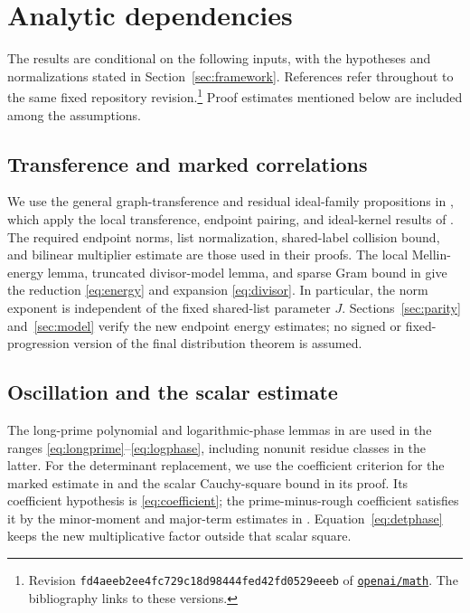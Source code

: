 \appendix
\section{Analytic dependencies}\label{sec:sources}

The results are conditional on the following inputs, with the hypotheses
and normalizations stated in Section~\ref{sec:framework}. References
\cite{D,S,P,Z} refer throughout to the same fixed repository revision.\footnote{Revision
\texttt{fd4aeeb2ee4fc729c18d98444fed42fd0529eeeb} of
\href{https://github.com/openai/math/tree/fd4aeeb2ee4fc729c18d98444fed42fd0529eeeb}{\texttt{openai/math}}.
The bibliography links to these versions.}
Proof estimates mentioned below are included among the assumptions.

\subsection*{Transference and marked correlations}
We use the general graph-transference and residual ideal-family
propositions in \cite[Section 6]{D}, which apply the local transference,
endpoint pairing, and ideal-kernel results of \cite[Sections 3--4]{S}.
The required endpoint norms, list normalization, shared-label collision
bound, and bilinear multiplier estimate are those used in their proofs.
The local Mellin-energy lemma, truncated divisor-model lemma, and sparse
Gram bound in \cite[Section 6]{D} give the reduction
\eqref{eq:energy} and expansion \eqref{eq:divisor}.
In particular, the norm exponent is independent of the fixed shared-list
parameter $J$. Sections~\ref{sec:parity} and~\ref{sec:model} verify the
new endpoint energy estimates; no signed or fixed-progression version
of the final distribution theorem is assumed.

\subsection*{Oscillation and the scalar estimate}
The long-prime polynomial and logarithmic-phase lemmas in
\cite[Appendix A]{D} are used in the ranges
\eqref{eq:longprime}--\eqref{eq:logphase}, including nonunit residue
classes in the latter. For the determinant replacement, we use the
coefficient criterion for the marked estimate in \cite[Section 8]{P}
and the scalar Cauchy-square bound in its proof. Its coefficient
hypothesis is \eqref{eq:coefficient}; the prime-minus-rough coefficient
satisfies it by the minor-moment and major-term estimates in
\cite[Sections 3--5]{D}. Equation~\eqref{eq:detphase} keeps the new
multiplicative factor outside that scalar square.

